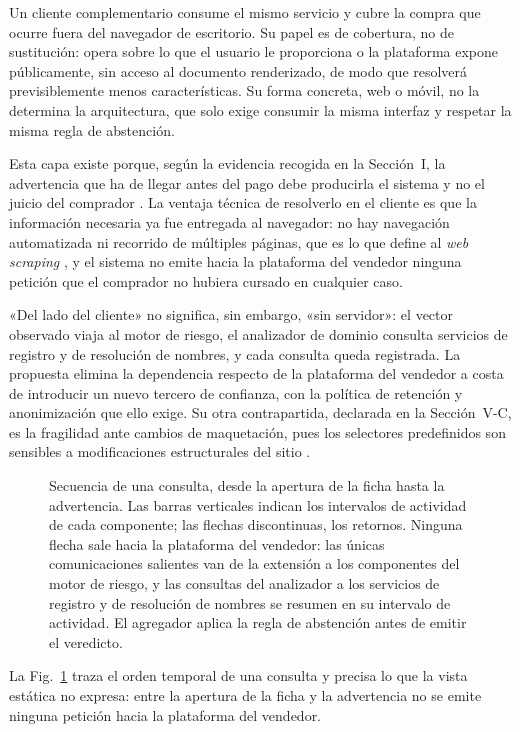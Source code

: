 Un cliente complementario consume el mismo servicio y cubre la compra que ocurre fuera del
navegador de escritorio. Su papel es de cobertura, no de sustitución: opera sobre lo que el
usuario le proporciona o la plataforma expone públicamente, sin acceso al documento
renderizado, de modo que resolverá previsiblemente menos características. Su forma concreta,
web o móvil, no la determina la arquitectura, que solo exige consumir la misma interfaz y
respetar la misma regla de abstención.

Esta capa existe porque, según la evidencia recogida en la Sección~I, la advertencia que ha
de llegar antes del pago debe producirla el sistema y no el juicio del comprador
\cite{ref27, ref3}. La ventaja técnica de resolverlo en el cliente es que la información
necesaria ya fue entregada al navegador: no hay navegación automatizada ni recorrido de
múltiples páginas, que es lo que define al \textit{web scraping} \cite{ref24}, y el sistema no
emite hacia la plataforma del vendedor ninguna petición que el comprador no hubiera cursado en
cualquier caso.

«Del lado del cliente» no significa, sin embargo, «sin servidor»: el vector observado viaja al
motor de riesgo, el analizador de dominio consulta servicios de registro y de resolución de
nombres, y cada consulta queda registrada. La propuesta elimina la dependencia respecto de la
plataforma del vendedor a costa de introducir un nuevo tercero de confianza, con la política
de retención y anonimización que ello exige. Su otra contrapartida, declarada en la
Sección~V-C, es la fragilidad ante cambios de maquetación, pues los selectores predefinidos
son sensibles a modificaciones estructurales del sitio \cite{ref24}.

\begin{figure}[t]
\centering
\resizebox{0.95\textwidth}{!}{}
\caption{Secuencia de una consulta, desde la apertura de la ficha hasta la advertencia. Las
barras verticales indican los intervalos de actividad de cada componente; las flechas
discontinuas, los retornos. Ninguna flecha sale hacia la plataforma del vendedor: las únicas
comunicaciones salientes van de la extensión a los componentes del motor de riesgo, y las
consultas del analizador a los servicios de registro y de resolución de nombres se resumen en
su intervalo de actividad. El agregador aplica la regla de abstención antes de emitir el
veredicto.}
\label{fig:secuencia}
\end{figure}

La Fig.~\ref{fig:secuencia} traza el orden temporal de una consulta y precisa lo que la vista
estática no expresa: entre la apertura de la ficha y la advertencia no se emite ninguna
petición hacia la plataforma del vendedor.


